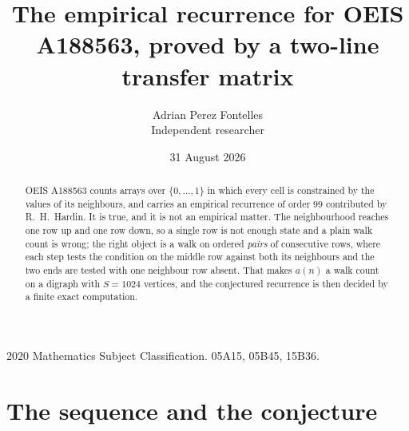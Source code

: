 \documentclass[11pt,a4paper]{article}
\title{The empirical recurrence for OEIS A188563, proved by a two-line transfer matrix}
\author{Adrian Perez Fontelles\\ \small Independent researcher}
\date{31 August 2026}
\theoremstyle{plain}
\theoremstyle{definition}
\begin{document}
\maketitle

\begin{abstract}
OEIS A188563 counts arrays over $\{0,\dots,1\}$ in which every cell is constrained by the
values of its neighbours, and carries an empirical recurrence of order $99$ contributed
by R.~H.~Hardin. It is true, and it is not an empirical matter. The neighbourhood reaches one
row up and one row down, so a single row is not enough state and a plain walk count
is wrong; the right object is a walk on ordered \emph{pairs} of consecutive rows, where
each step tests the condition on the middle row against both its neighbours and the two
ends are tested with one neighbour row absent. That makes $a(n)$ a walk count on a digraph
with $S=1024$ vertices, and the conjectured recurrence is then decided by a finite exact
computation.
\end{abstract}

\noindent\small 2020 Mathematics Subject Classification. 05A15, 05B45, 15B36.\normalsize

\section{The sequence and the conjecture}
\end{document}
